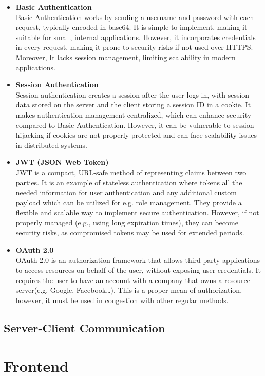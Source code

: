 \begin{itemize}
    \item \textbf{Basic Authentication} \\
    Basic Authentication works by sending a username and password with each request,
    typically encoded in base64.\cite{basic_auth} It is simple to implement, making it suitable for
    small, internal applications. However, it incorporates credentials in every request,
    making it prone to security risks if not used over HTTPS. Moreover, It lacks session management,
    limiting scalability in modern applications.

    \item \textbf{Session Authentication} \\
    Session authentication creates a session after the user logs in, with session
    data stored on the server and the client storing a session ID in a cookie.
    It makes authentication management centralized, which can enhance security compared to Basic Authentication.
    However, it can be vulnerable to session hijacking if cookies are not properly protected
    and can face scalability issues in distributed systems.\cite{session_auth}

    \item \textbf{JWT (JSON Web Token)} \\
    JWT is a compact, URL-safe method of representing claims between two parties.\cite{jwt}
    It is an example of stateless authentication where tokens all the needed information for user authentication
    and any additional custom payload which can be utilized for e.g. role management.
    They provide a flexible and scalable way to implement secure authentication.
    However, if not properly managed (e.g., using long expiration times), they can become security risks,
    as compromised tokens may be used for extended periods.

    \item \textbf{OAuth 2.0} \\
    OAuth 2.0 is an authorization framework that allows third-party applications to access resources
    on behalf of the user, without exposing user credentials.\cite{oauth2} It requires the user to have an account
    with a company that owns a resource server(e.g. Google, Facebook\ldots). This is a proper mean of
    authorization, however, it must be used in congestion with other regular methods.
\end{itemize}


\subsection{Server-Client Communication}


\section{Frontend}
